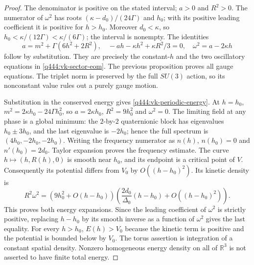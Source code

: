 \begin{proof}
The denominator is positive on the stated interval; \(a>0\) and
\(R^2>0\). The numerator of \(\omega^2\) has roots
\((\kappa-d_0)/(24\Gamma)\) and \(h_0\); with its positive leading
coefficient it is positive for \(h>h_0\). Moreover
\(d_0<\kappa\), so \(h_0<\kappa/(12\Gamma)<\kappa/(6\Gamma)\);
the interval is nonempty. The identities
\[
 a=m^2+\Gamma(6h^2+2R^2),\quad
 -ah-\kappa h^2+\kappa R^2/3=0,\quad
 \omega^2=a-2\kappa h
\]
follow by substitution. They are precisely the constant-\(h\)
and the two oscillatory equations in \eqref{q444:vk-sector-eom}.
The previous proposition proves all gauge equations.
The triplet norm is preserved by the full \(SU(3)\) action, so its
nonconstant value rules out a purely gauge motion.

Substitution in the conserved energy gives
\eqref{q444:vk-periodic-energy}. At \(h=h_0\),
\(m^2=2\kappa h_0-24\Gamma h_0^2\), so
\(a=2\kappa h_0\), \(R^2=9h_0^2\) and \(\omega^2=0\).
The limiting field at any phase is a global minimum: the
\(2\)-by-\(2\) quaternionic block has eigenvalues \(h_0\pm3h_0\),
and the last eigenvalue is \(-2h_0\); hence the full spectrum is
\((4h_0,-2h_0,-2h_0)\).
Writing the frequency numerator as \(n(h)\),
\(n(h_0)=0\) and \(n'(h_0)=2d_0\). Taylor expansion proves the
frequency estimate. The curve \(h\mapsto(h,R(h),0)\) is smooth
near \(h_0\), and its endpoint is a critical point of \(V\).
Consequently its potential differs from \(V_0\) by
\(O((h-h_0)^2)\). Its kinetic density is
\[
 R^2\omega^2
 =\left(9h_0^2+O(h-h_0)\right)
   \left(\frac{2d_0}{\Delta_0}(h-h_0)+O((h-h_0)^2)\right).
 \]
This proves both energy expansions. Since the leading coefficient
of \(\omega^2\) is strictly positive, replacing \(h-h_0\) by its
smooth inverse as a function of \(\omega^2\) gives the last equality.
For every \(h>h_0\), \(E(h)>V_0\) because the kinetic term is
positive and the potential is bounded below by \(V_0\).
The torus assertion is integration of a constant spatial density.
Nonzero homogeneous energy density on all of \(\mathbb R^3\) is
not asserted to have finite total energy.
\end{proof}

